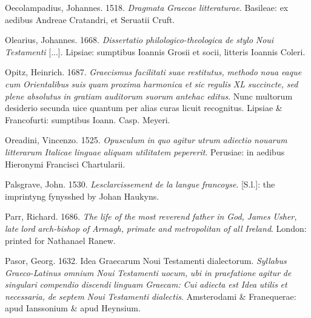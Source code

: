 Oecolampadius, Johannes. 1518. \textit{Dragmata} \textit{Graecae} \textit{litteraturae}. Basileae: ex aedibus Andreae Cratandri, et Seruatii Cruft.

Olearius, Johannes. 1668. \textit{Dissertatio} \textit{philologico-theologica} \textit{de} \textit{stylo} \textit{Noui} \textit{Testamenti} [...]. Lipsiae: sumptibus Ioannis Grosii et socii, litteris Ioannis Coleri.

Opitz, Heinrich. 1687. \textit{Graecismus} \textit{facilitati} \textit{suae} \textit{restitutus,} \textit{methodo} \textit{noua} \textit{eaque} \textit{cum} \textit{Orientalibus} \textit{suis} \textit{quam} \textit{proxima} \textit{harmonica} \textit{et} \textit{sic} \textit{regulis} \textit{XL} \textit{succincte,} \textit{sed} \textit{plene} \textit{absolutus} \textit{in} \textit{gratiam} \textit{auditorum} \textit{suorum} \textit{antehac} \textit{editus}. Nunc multorum desiderio secunda uice quantum per alias curas licuit recognitus. Lipsiae \& Francofurti: sumptibus Ioann. Casp. Meyeri.

Oreadini, Vincenzo. 1525. \textit{Opusculum} \textit{in} \textit{quo} \textit{agitur} \textit{utrum} \textit{adiectio} \textit{nouarum} \textit{litterarum} \textit{Italicae} \textit{linguae} \textit{aliquam} \textit{utilitatem} \textit{pepererit}. Perusiae: in aedibus Hieronymi Francisci Chartularii.

Palsgrave, John. 1530. \textit{Lesclarcissement} \textit{de} \textit{la} \textit{langue} \textit{francoyse}. [S.l.]: the imprintyng fynysshed by Johan Haukyns.

Parr, Richard. 1686. \textit{The} \textit{life} \textit{of} \textit{the} \textit{most} \textit{reverend} \textit{father} \textit{in} \textit{God,} \textit{James} \textit{Usher,} \textit{late} \textit{lord} \textit{arch-bishop} \textit{of} \textit{Armagh,} \textit{primate} \textit{and} \textit{metropolitan} \textit{of} \textit{all} \textit{Ireland}. London: printed for Nathanael Ranew.

Pasor, Georg. 1632. Idea Graecarum Noui Testamenti dialectorum. \textit{Syllabus} \textit{Graeco-Latinus} \textit{omnium} \textit{Noui} \textit{Testamenti} \textit{uocum,} \textit{ubi} \textit{in} \textit{praefatione} \textit{agitur} \textit{de} \textit{singulari} \textit{compendio} \textit{discendi} \textit{linguam} \textit{Graecam:} \textit{Cui} \textit{adiecta} \textit{est} \textit{Idea} \textit{utilis} \textit{et} \textit{necessaria,} \textit{de} \textit{septem} \textit{Noui} \textit{Testamenti} \textit{dialectis}. Amsterodami \& Franequerae: apud Ianssonium \& apud Heynsium.

